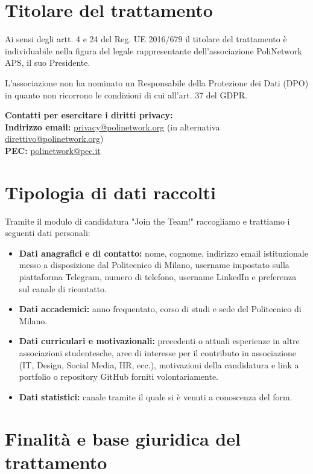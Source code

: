 \documentclass[letter]{core/polinetwork}
\begin{document}
\pnMakeHeader

\section{Titolare del trattamento}

Ai sensi degli artt. 4 e 24 del Reg. UE 2016/679 il titolare del trattamento è individuabile nella figura del legale rappresentante dell'associazione PoliNetwork APS, il suo Presidente.

L'associazione non ha nominato un Responsabile della Protezione dei Dati (DPO) in quanto non ricorrono le condizioni di cui all'art. 37 del GDPR.

\textbf{Contatti per esercitare i diritti privacy:} \\
\textbf{Indirizzo email:} \href{mailto:privacy@polinetwork.org}{privacy@polinetwork.org} (in alternativa \href{mailto:direttivo@polinetwork.org}{direttivo@polinetwork.org}) \\
\textbf{PEC:} \href{mailto:polinetwork@pec.it}{polinetwork@pec.it}

\section{Tipologia di dati raccolti}

Tramite il modulo di candidatura "Join the Team!" raccogliamo e trattiamo i seguenti dati personali:
\begin{itemize}
    \item \textbf{Dati anagrafici e di contatto:} nome, cognome, indirizzo email istituzionale messo a disposizione dal Politecnico di Milano, username impostato sulla piattaforma Telegram, numero di telefono, username LinkedIn e preferenza sul canale di ricontatto.
    \item \textbf{Dati accademici:} anno frequentato, corso di studi e sede del Politecnico di Milano.
    \item \textbf{Dati curriculari e motivazionali:} precedenti o attuali esperienze in altre associazioni studentesche, aree di interesse per il contributo in associazione (IT, Design, Social Media, HR, ecc.), motivazioni della candidatura e link a portfolio o repository GitHub forniti volontariamente.
    \item \textbf{Dati statistici:} canale tramite il quale si è venuti a conoscenza del form.
\end{itemize}

\section{Finalità e base giuridica del trattamento}
\end{document}

